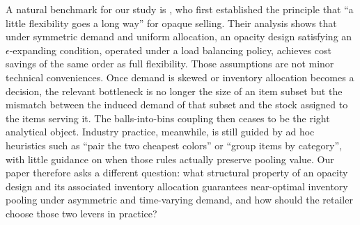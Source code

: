 A natural benchmark for our study is \cite{EYZ2026}, who first established the principle that ``a little flexibility goes a long way'' for opaque selling.
Their analysis shows that under symmetric demand and uniform allocation, an opacity design satisfying an $\epsilon$-expanding condition, operated under a load balancing policy, achieves cost savings of the same order as full flexibility.
Those assumptions are not minor technical conveniences.
Once demand is skewed or inventory allocation becomes a decision, the relevant bottleneck is no longer the size of an item subset but the mismatch between the induced demand of that subset and the stock assigned to the items serving it.
The balls-into-bins coupling then ceases to be the right analytical object.
Industry practice, meanwhile, is still guided by ad hoc heuristics such as ``pair the two cheapest colors'' or ``group items by category'', with little guidance on when those rules actually preserve pooling value.
Our paper therefore asks a different question: what structural property of an opacity design and its associated inventory allocation guarantees near-optimal inventory pooling under asymmetric and time-varying demand, and how should the retailer choose those two levers in practice?


